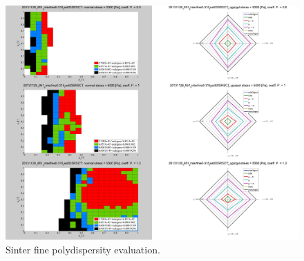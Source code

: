 \begin{figure}[!htb]
\centering
\includegraphics[width=.96\columnwidth]{images/086sinter0315}
\caption[Sinter fine polydispersity evaluation]{Sinter fine polydispersity evaluation.}
\label{fig:086sinter0315}
\end{figure}